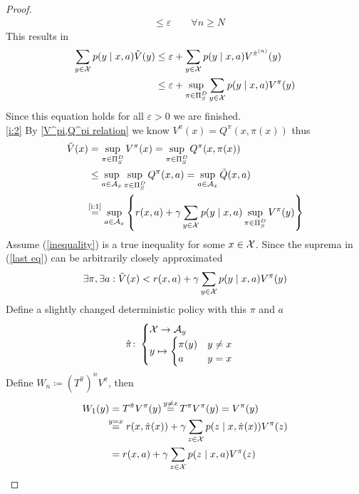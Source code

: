 \begin{proof}
\begin{align*}
		&\le \varepsilon \qquad \forall n\ge N
	\end{align*}
	This results in
	\begin{align*}
		\sum_{y\in\mathcal{X}}p(y\mid x,a)\tilde{V}(y) 
		&\le \varepsilon + \sum_{y\in\mathcal{X}}p(y\mid x,a) V^{\hat{\pi}^{(n)}}(y) \\
		&\le \varepsilon + \sup_{\pi\in\Pi_S^D} \sum_{y\in\mathcal{X}}p(y\mid x,a) V^\pi(y)
	\end{align*}
	Since this equation holds for all \(\varepsilon>0\) we are finished.
	\\
	\ref{i:2}
	By \ref{V^pi,Q^pi relation} we know \(V^\pi(x)=Q^\pi(x,\pi(x))\) thus
	\begin{align}
		\tilde{V}(x)& =\sup_{\pi \in \detPolicy} V^\pi(x)
		=\sup_{\pi \in \detPolicy}Q^\pi(x,\pi(x)) 
		\nonumber\\
		&\le\sup_{a\in \cA_x} \sup_{\pi\in\detPolicy} Q^\pi(x,a)
		=\sup_{a\in \cA_x} \tilde{Q}(x,a)
		\label{inequality}
		\\
		&\lxeq{\text{\ref{i:1}}} \sup_{a\in \cA_x}\left\{ r(x,a)+\gamma\sum\limits_{y\in\cX}p(y\mid x,a) 
		\sup_{\pi\in\detPolicy} V^\pi(y) \right\} \label{last eq}
	\end{align}
	Assume (\ref{inequality}) is a true inequality for some \(x\in\mathcal{X}\). Since the suprema in (\ref{last eq}) can be arbitrarily closely approximated 
	\[ 
		\exists \pi, \exists a : \tilde{V}(x) < r(x,a) 
		+ \gamma\sum_{y\in\mathcal{X}} p(y\mid x,a) V^\pi(y)
	\]
	Define a slightly changed deterministic policy with this \(\pi\) and \(a\)
	\begin{align*}
		\hat{\pi}\colon
		\begin{cases}
			\mathcal{X}\to\mathcal{A}_y\\
			y\mapsto
			\begin{cases}
				\pi(y) & y\neq x\\
				a & y=x
			\end{cases}
		\end{cases}
	\end{align*}
	Define \(W_n\coloneqq (T^{\hat{\pi}})^n V^\pi\), then
	\begin{align*}
		W_1(y)&=T^{\hat{\pi}}V^\pi(y) \xeq{y\neq x} T^\pi V^\pi(y) = V^\pi(y)\\
		&\lxeq{y=x} r(x, \hat{\pi}(x)) 
		+ \gamma \sum_{z\in\cX} p(z \mid x, \hat{\pi}(x)) V^\pi(z)  \\
		&=r(x, a) + \gamma \sum_{z\in\cX} p(z \mid x, a) V^\pi(z) \\

\end{align*}
\end{proof}
